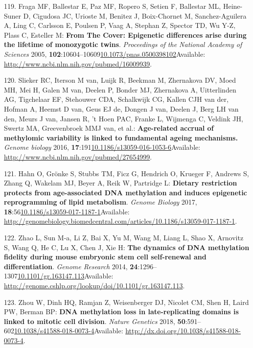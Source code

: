 \documentclass[
]{book}
\begin{document}
\leavevmode\hypertarget{ref-Fraga2005}{}%
119. Fraga MF, Ballestar E, Paz MF, Ropero S, Setien F, Ballestar ML, Heine-Suner D, Cigudosa JC, Urioste M, Benitez J, Boix-Chornet M, Sanchez-Aguilera A, Ling C, Carlsson E, Poulsen P, Vaag A, Stephan Z, Spector TD, Wu Y-Z, Plass C, Esteller M: \textbf{From The Cover: Epigenetic differences arise during the lifetime of monozygotic twins}. \emph{Proceedings of the National Academy of Sciences} 2005, \textbf{102}:10604--10609\href{https://doi.org/10.1073/pnas.0500398102}{10.1073/pnas.0500398102}Available: \url{http://www.ncbi.nlm.nih.gov/pubmed/16009939}.

\leavevmode\hypertarget{ref-Slieker2016}{}%
120. Slieker RC, Iterson M van, Luijk R, Beekman M, Zhernakova DV, Moed MH, Mei H, Galen M van, Deelen P, Bonder MJ, Zhernakova A, Uitterlinden AG, Tigchelaar EF, Stehouwer CDA, Schalkwijk CG, Kallen CJH van der, Hofman A, Heemst D van, Geus EJ de, Dongen J van, Deelen J, Berg LH van den, Meurs J van, Jansen R, 't Hoen PAC, Franke L, Wijmenga C, Veldink JH, Swertz MA, Greevenbroek MMJ van, et al.: \textbf{Age-related accrual of methylomic variability is linked to fundamental ageing mechanisms.} \emph{Genome biology} 2016, \textbf{17}:191\href{https://doi.org/10.1186/s13059-016-1053-6}{10.1186/s13059-016-1053-6}Available: \url{http://www.ncbi.nlm.nih.gov/pubmed/27654999}.

\leavevmode\hypertarget{ref-Hahn2017}{}%
121. Hahn O, Grönke S, Stubbs TM, Ficz G, Hendrich O, Krueger F, Andrews S, Zhang Q, Wakelam MJ, Beyer A, Reik W, Partridge L: \textbf{Dietary restriction protects from age-associated DNA methylation and induces epigenetic reprogramming of lipid metabolism}. \emph{Genome Biology} 2017, \textbf{18}:56\href{https://doi.org/10.1186/s13059-017-1187-1}{10.1186/s13059-017-1187-1}Available: \url{http://genomebiology.biomedcentral.com/articles/10.1186/s13059-017-1187-1}.

\leavevmode\hypertarget{ref-Zhao2014}{}%
122. Zhao L, Sun M-a, Li Z, Bai X, Yu M, Wang M, Liang L, Shao X, Arnovitz S, Wang Q, He C, Lu X, Chen J, Xie H: \textbf{The dynamics of DNA methylation fidelity during mouse embryonic stem cell self-renewal and differentiation}. \emph{Genome Research} 2014, \textbf{24}:1296--1307\href{https://doi.org/10.1101/gr.163147.113}{10.1101/gr.163147.113}Available: \url{http://genome.cshlp.org/lookup/doi/10.1101/gr.163147.113}.

\leavevmode\hypertarget{ref-Zhou2018}{}%
123. Zhou W, Dinh HQ, Ramjan Z, Weisenberger DJ, Nicolet CM, Shen H, Laird PW, Berman BP: \textbf{DNA methylation loss in late-replicating domains is linked to mitotic cell division}. \emph{Nature Genetics} 2018, \textbf{50}:591--602\href{https://doi.org/10.1038/s41588-018-0073-4}{10.1038/s41588-018-0073-4}Available: \url{http://dx.doi.org/10.1038/s41588-018-0073-4}.
\end{document}
